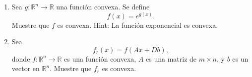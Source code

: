 \begin{enumerate}
    \item Sea \( g : \mathbb{R}^n \rightarrow \mathbb{R} \) una función convexa. Se define 
\[
f(x) = e^{g(x)}.
\]
Muestre que \( f \) es convexa. Hint: La función exponencial es convexa.
\item Sea 
\[
f_r(x) = f(Ax + D b),
\]
donde \( f : \mathbb{R}^n \rightarrow \mathbb{R} \) es una función convexa, \( A \) es una matriz de \( m \times n \), y \( b \) es un vector en \( \mathbb{R}^n \). Muestre que $f_r$ es convexa.
\end{enumerate}
